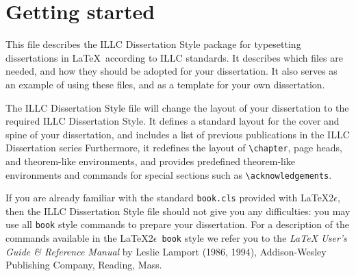\chapter{Getting started}

This file describes the ILLC Dissertation Style package for
typesetting dissertations in \LaTeX\ according to ILLC standards.
It describes which files are needed, and how they should be adopted
for your dissertation.
It also serves as an example of using these files, and as a template
for your own dissertation.

The ILLC Dissertation Style file will change the
layout of your dissertation to the required ILLC Dissertation Style.
It defines a standard layout for the cover and spine of your dissertation,
and includes a list of previous publications in the ILLC Dissertation series
Furthermore, it redefines the layout of \verb|\chapter|, page heads,
and theorem-like environments,
and provides predefined theorem-like environments and
commands for special sections such as \verb|\acknowledgements|.

If you are already familiar with the standard {\tt book.cls} provided with
\LaTeX 2$\epsilon$, then the ILLC Dissertation Style file should not give you
any difficulties: you may use all {\tt book} style commands to prepare 
your dissertation.
For a description of the commands available in the \LaTeX 2$\epsilon$\ 
{\tt book} style we refer you to the {\em \LaTeX{} User's Guide \& Reference
Manual\/} by Leslie Lamport (1986, 1994), Addison-Wesley Publishing
Company, Reading, Mass.

